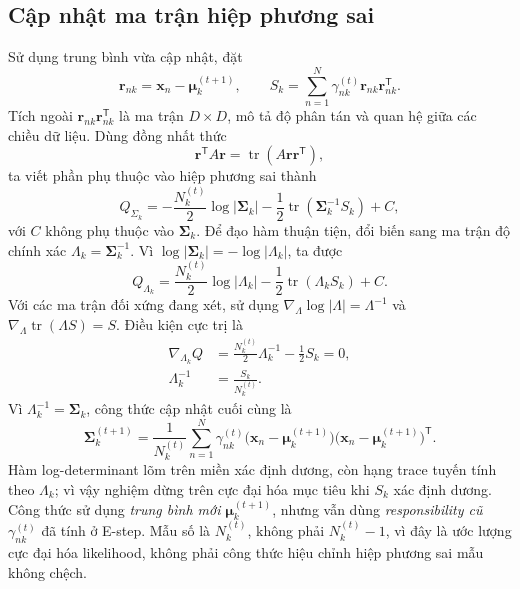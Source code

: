 \subsection{Cập nhật ma trận hiệp phương sai}
Sử dụng trung bình vừa cập nhật, đặt
\begin{equation}
\mathbf{r}_{nk}=\mathbf{x}_n-\boldsymbol{\mu}_k^{(t+1)},\qquad
S_k=\sum_{n=1}^N\gamma_{nk}^{(t)}\mathbf{r}_{nk}\mathbf{r}_{nk}^{\mathsf T}.
\end{equation}
Tích ngoài $\mathbf{r}_{nk}\mathbf{r}_{nk}^{\mathsf T}$ là ma trận $D\times D$, mô tả độ phân tán và quan hệ giữa các chiều dữ liệu. Dùng đồng nhất thức
\begin{equation}
\mathbf{r}^{\mathsf T}A\mathbf{r}
=\operatorname{tr}(A\mathbf{r}\mathbf{r}^{\mathsf T}),
\end{equation}
ta viết phần phụ thuộc vào hiệp phương sai thành
\begin{equation}
Q_{\Sigma_k}=-\frac{N_k^{(t)}}2\log|\boldsymbol{\Sigma}_k|
-\frac12\operatorname{tr}(\boldsymbol{\Sigma}_k^{-1}S_k)+C,
\end{equation}
với $C$ không phụ thuộc vào $\boldsymbol{\Sigma}_k$. Để đạo hàm thuận tiện, đổi biến sang ma trận độ chính xác $\Lambda_k=\boldsymbol{\Sigma}_k^{-1}$. Vì $\log|\boldsymbol{\Sigma}_k|=-\log|\Lambda_k|$, ta được
\begin{equation}
Q_{\Lambda_k}=\frac{N_k^{(t)}}2\log|\Lambda_k|
-\frac12\operatorname{tr}(\Lambda_kS_k)+C.
\end{equation}
Với các ma trận đối xứng đang xét, sử dụng $\nabla_{\Lambda}\log|\Lambda|=\Lambda^{-1}$ và $\nabla_{\Lambda}\operatorname{tr}(\Lambda S)=S$. Điều kiện cực trị là
\begin{align}
\nabla_{\Lambda_k}Q
&=\frac{N_k^{(t)}}2\Lambda_k^{-1}-\frac12S_k=0,\\
\Lambda_k^{-1}&=\frac{S_k}{N_k^{(t)}}.
\end{align}
Vì $\Lambda_k^{-1}=\boldsymbol{\Sigma}_k$, công thức cập nhật cuối cùng là
\begin{equation}
\boxed{\boldsymbol{\Sigma}_k^{(t+1)}
=\frac{1}{N_k^{(t)}}\sum_{n=1}^N\gamma_{nk}^{(t)}
\big(\mathbf{x}_n-\boldsymbol{\mu}_k^{(t+1)}\big)
\big(\mathbf{x}_n-\boldsymbol{\mu}_k^{(t+1)}\big)^{\mathsf T}.}
\label{eq:mstep-sigma}
\end{equation}
Hàm log-determinant lõm trên miền xác định dương, còn hạng trace tuyến tính theo $\Lambda_k$; vì vậy nghiệm dừng trên cực đại hóa mục tiêu khi $S_k$ xác định dương. Công thức sử dụng \emph{trung bình mới} $\boldsymbol{\mu}_k^{(t+1)}$, nhưng vẫn dùng \emph{responsibility cũ} $\gamma_{nk}^{(t)}$ đã tính ở E-step. Mẫu số là $N_k^{(t)}$, không phải $N_k^{(t)}-1$, vì đây là ước lượng cực đại hóa likelihood, không phải công thức hiệu chỉnh hiệp phương sai mẫu không chệch.

